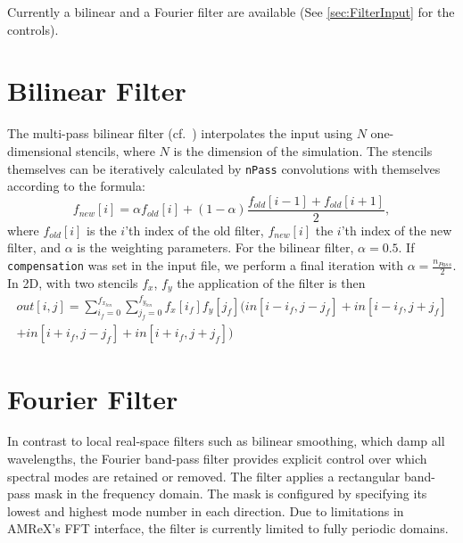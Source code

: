 \documentclass[11pt]{article}
\begin{document}
Currently a bilinear and a Fourier filter are available (See \ref{sec:FilterInput} for the controls).

\section{Bilinear Filter}\label{sec:BilinearFilter}
The multi-pass bilinear filter (cf.~\cite{vay2011}) interpolates the input using $N$ one-dimensional stencils, where $N$ is the dimension of the simulation. The stencils themselves can be iteratively calculated by \lstinline{nPass} convolutions with themselves according to the formula:
\begin{equation}
    f_{new}[i] = \alpha f_{old}[i] + (1 - \alpha)\frac{f_{old}[i-1] + f_{old}[i+1]}{2},
\end{equation}
where $f_{old}[i]$ is the $i$'th index of the old filter, $f_{new}[i]$ the $i$'th index of the new filter, and $\alpha$ is the weighting parameters. For the bilinear filter, $\alpha=0.5$.
If \lstinline{compensation} was set in the input file, we perform a final iteration with $\alpha=\frac{n_{Pass}}{2}$.
In 2D, with two stencils $f_x$, $f_y$ the application of the filter is then
\begin{multline}
    out[i,j] = \sum_{i_f=0}^{f_{x_{len}}}\sum_{j_f=0}^{f_{y_{len}}} f_x[i_f]f_y[j_f]\big(in[i-i_f,j-j_f] + in[i-i_f,j+j_f]\\ + in[i+i_f,j-j_f] + in[i+i_f,j+j_f]\big)
\end{multline}

\section{Fourier Filter}\label{sec:FourierFilter}
In contrast to local real-space filters such as bilinear smoothing, which damp all wavelengths, the Fourier band-pass filter provides explicit control over which spectral modes are retained or removed. The filter applies a rectangular band-pass mask in the frequency domain. The mask is configured by specifying its lowest and highest mode number in each direction. Due to limitations in AMReX's FFT interface, the filter is currently limited to fully periodic domains.
\end{document}
